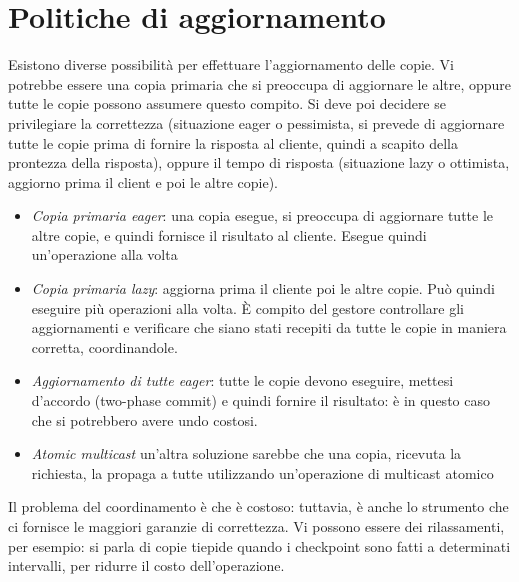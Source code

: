 \section{Politiche di aggiornamento}
Esistono diverse possibilità per effettuare l'aggiornamento delle copie. Vi
potrebbe essere una copia primaria che si
preoccupa di aggiornare le altre, oppure tutte le copie possono assumere questo
compito. Si deve poi decidere se
privilegiare la correttezza (situazione eager o pessimista, si prevede di
aggiornare tutte le copie prima di fornire
la risposta al cliente, quindi a scapito della prontezza della risposta),
oppure il tempo di risposta (situazione
lazy o ottimista, aggiorno prima il client e poi le altre copie).
\begin{itemize}
 \item \textit{Copia primaria eager}: una copia esegue, si preoccupa di
aggiornare tutte le altre copie, e quindi
 fornisce il risultato al cliente. Esegue quindi un'operazione alla volta
 \item \textit{Copia primaria lazy}: aggiorna prima il cliente poi le altre
copie. Può quindi eseguire più operazioni
 alla volta. È compito del gestore controllare gli aggiornamenti e verificare
che siano stati recepiti da tutte le copie
 in maniera corretta, coordinandole.
 \item \textit{Aggiornamento di tutte eager}: tutte le copie devono eseguire,
mettesi d'accordo (two-phase commit) e
 quindi fornire il risultato: è in questo caso che si potrebbero avere undo
 costosi.
 \item \textit{Atomic multicast} un'altra soluzione sarebbe che una copia,
 ricevuta la richiesta, la propaga a tutte utilizzando un'operazione di
 multicast atomico
\end{itemize}
Il problema del coordinamento è che è costoso: tuttavia, è anche lo strumento
che ci fornisce le maggiori garanzie di
correttezza. Vi possono essere dei rilassamenti, per esempio: si parla di copie
tiepide quando i checkpoint sono fatti
a determinati intervalli, per ridurre il costo dell'operazione.
